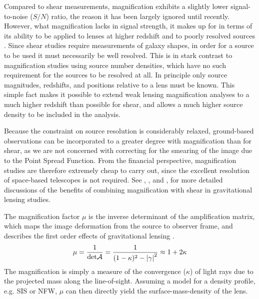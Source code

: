 \documentclass{article}
\begin{document}
Compared to shear measurements, magnification exhibits a slightly lower signal-to-noise ($S/N$) ratio, the reason it has been largely ignored until recently.  However, what magnification lacks in signal strength, it makes up for in terms of its ability to be applied to lenses at higher redshift and to poorly resolved sources \citep{Waerbeke10}.  Since shear studies require measurements of galaxy shapes, in order for a source to be used it must necessarily be well resolved.  This is in stark contrast to magnification studies using source number densities, which have no such requirement for the sources to be resolved at all.  In principle only source magnitudes, redshifts, and positions relative to a lens must be known.  This simple fact makes it possible to extend weak lensing magnification analyses to a much higher redshift than possible for shear, and allows a much higher source density to be included in the analysis.  

Because the constraint on source resolution is considerably relaxed, ground-based observations can be incorporated to a greater degree with magnification than for shear, as we are not concerned with correcting for the smearing of the image due to the Point Spread Function. From the financial perspective, magnification studies are therefore extremely cheap to carry out, since the excellent resolution of space-based telescopes is not required. See \citet{Waerbeke10}, \citet{RozoSchmidt10}, and \citet{Umetsu11}, for more detailed discussions of the benefits of combining magnification with shear in gravitational lensing studies.

The magnification factor $\mu$ is the inverse determinant of the amplification matrix, which maps the image deformation from the source to observer frame, and describes the first order effects of gravitational lensing \citep{BartelmannSchneider01}.
\begin{equation}
\mu = \frac{1}{\mathrm{det} \cal{A}} = 
\frac{1}{(1-\kappa)^2 - \left|\gamma\right|^2} \approx 1+2\kappa
\label{mu}
\end{equation}
The magnification is simply a measure of the convergence ($\kappa$) of light rays due to the projected mass along the line-of-sight.  Assuming a model for a density profile, e.g. SIS or NFW, $\mu$ can then directly yield the surface-mass-density of the lens.
\end{document}
